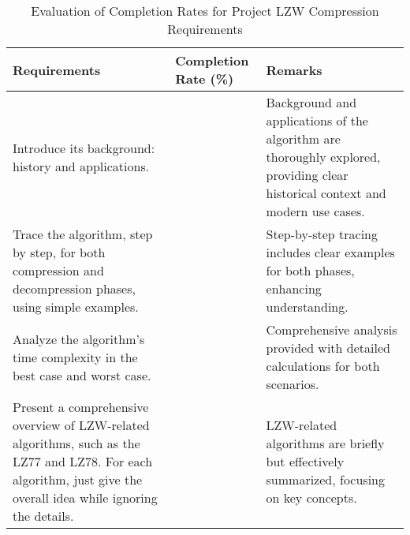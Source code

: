 \begin{longtable}{|>{\raggedright\arraybackslash}p{8.5cm}|>{\centering\arraybackslash}p{2.5cm}|>{\raggedright\arraybackslash}p{4cm}|}

\caption{Evaluation of Completion Rates for Project LZW Compression Requirements}


\hline
\textbf{Requirements} & \textbf{Completion Rate (\%)} & \textbf{Remarks} \\ \hline
\endhead
Introduce its background: history and applications. & 100 & Background and applications of the algorithm are thoroughly explored, providing clear historical context and modern use cases. \\ \hline
Trace the algorithm, step by step, for both compression and decompression phases, using simple examples. & 100 & Step-by-step tracing includes clear examples for both phases, enhancing understanding. \\ \hline
Analyze the algorithm’s time complexity in the best case and worst case. & 100 & Comprehensive analysis provided with detailed calculations for both scenarios. \\ \hline
Present a comprehensive overview of LZW-related algorithms, such as the LZ77 and LZ78. For each algorithm, just give the overall idea while ignoring the details. & 100 & LZW-related algorithms are briefly but effectively summarized, focusing on key concepts. \\ \hline
\end{longtable}